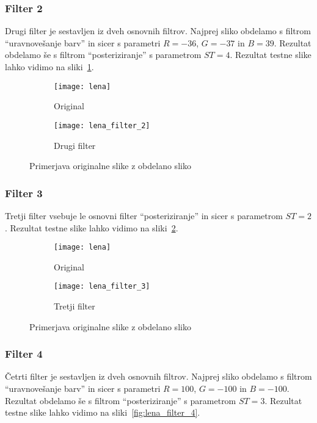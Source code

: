 \subsubsection*{Filter 2}
Drugi filter je sestavljen iz dveh osnovnih filtrov. Najprej sliko obdelamo s
filtrom ``uravnovešanje barv'' in sicer s parametri $R = -36$, $G = -37$ in
$B = 39$. Rezultat obdelamo še s filtrom ``posteriziranje'' s parametrom
$ST = 4$. Rezultat testne slike lahko vidimo na sliki~\ref{fig:lena_filter_2}.

\begin{figure}[!ht]
    \centering
    \begin{subfigure}[b]{0.4\textwidth}
        \texttt{[image: lena]}
        \caption{Original}
    \end{subfigure}
    \begin{subfigure}[b]{0.4\textwidth}
        \texttt{[image: lena\_filter\_2]}
        \caption{Drugi filter}
    \end{subfigure}
    \caption{Primerjava originalne slike z obdelano sliko}
    \label{fig:lena_filter_2}
\end{figure}


\subsubsection*{Filter 3}
Tretji filter vsebuje le osnovni filter ``posteriziranje'' in sicer s parametrom
$ST = 2$. Rezultat testne slike lahko vidimo na sliki~\ref{fig:lena_filter_3}.

\begin{figure}[!ht]
    \centering
    \begin{subfigure}[b]{0.4\textwidth}
        \texttt{[image: lena]}
        \caption{Original}
    \end{subfigure}
    \begin{subfigure}[b]{0.4\textwidth}
        \texttt{[image: lena\_filter\_3]}
        \caption{Tretji filter}
    \end{subfigure}
    \caption{Primerjava originalne slike z obdelano sliko}
    \label{fig:lena_filter_3}
\end{figure}


\subsubsection*{Filter 4}
Četrti filter je sestavljen iz dveh osnovnih filtrov. Najprej sliko obdelamo s
filtrom ``uravnovešanje barv'' in sicer s parametri $R = 100$, $G = -100$ in
$B = -100$. Rezultat obdelamo še s filtrom ``posteriziranje'' s parametrom
$ST = 3$. Rezultat testne slike lahko vidimo na sliki~\ref{fig:lena_filter_4}.

